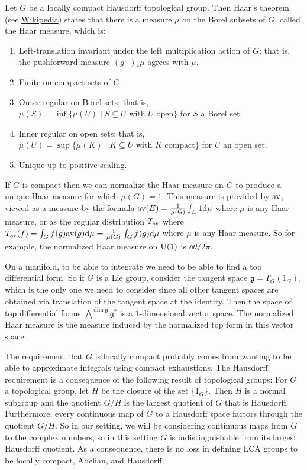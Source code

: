 \documentclass[../../rtnotes.tex]{subfiles}
\begin{document}
Let $G$ be a locally compact Hausdorff topological group. Then Haar's theorem (see \href{https://en.wikipedia.org/wiki/Haar_measure}{Wikipedia}) states that there is a measure $\mu$ on the Borel subsets of $G$, called the Haar measure, which is:
\begin{enumerate}
	\item Left-translation invariant under the left multiplication action of $G$; that is, the pushforward measure $(g\cdot)_\ast \mu$ agrees with $\mu$.
	\item Finite on compact sets of $G$.
	\item Outer regular on Borel sets; that is, $\mu(S) = \inf\{\mu(U)\mid S\subseteq U\text{ with $U$ open}\}$ for $S$ a Borel set. 
	\item Inner regular on open sets; that is, $\mu(U) = \sup\{\mu(K)\mid K\subseteq U\text{ with $K$ compact}\}$ for $U$ an open set.
	\item Unique up to positive scaling.
\end{enumerate}

If $G$ is compact then we can normalize the Haar measure on $G$ to produce a unique Haar measure for which $\mu(G) = 1$. This measure is provided by $\mathrm{av}$, viewed as a measure by the formula $\mathrm{av}(E) = \frac{1}{\mu(G)}\int_E 1 \dd\mu$ where $\mu$ is any Haar measure, or as the regular distribution $T_{\mathrm{av}}$ where $T_{\mathrm{av}}(f) = \int_G f(g)\mathrm{av}(g)\dd\mu = \frac{1}{\mu(G)}\int_G f(g) \dd\mu$ where $\mu$ is any Haar measure. So for example, the normalized Haar measure on $\operatorname{U}(1)$ is $\dd\theta/2\pi$.

On a manifold, to be able to integrate we need to be able to find a top differential form. So if $G$ is a Lie group, consider the tangent space $\mathfrak g = T_G(1_G)$, which is the only one we need to consider since all other tangent spaces are obtained via translation of the tangent space at the identity. Then the space of top differential forms $\bigwedge^{\dim \mathfrak g}\mathfrak g^\ast$ is a $1$-dimensional vector space. The normalized Haar measure is the measure induced by the normalized top form in this vector space.

The requirement that $G$ is locally compact probably comes from wanting to be able to approximate integrals using compact exhaustions. The Hausdorff requirement is a consequence of the following result of topological groups: For $G$ a topological group, let $H$ be the closure of the set $\{1_G\}$. Then $H$ is a normal subgroup and the quotient $G/H$ is the largest quotient of $G$ that is Hausdorff. Furthermore, every continuous map of $G$ to a Hausdorff space factors through the quotient $G/H$. So in our setting, we will be considering continuous maps from $G$ to the complex numbers, so in this setting $G$ is indistinguishable from its largest Hausdorff quotient. As a consequence, there is no loss in defining LCA groups to be locally compact, Abelian, and Hausdorff.
\end{document}

